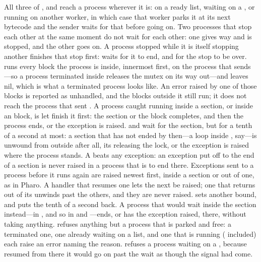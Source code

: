 All three of ,  and  reach a
process wherever it is: on a ready list, waiting on a , or
running on another worker, in which case that worker parks it at its next
bytecode and the sender waits for that before going on. Two processes that
stop each other at the same moment do not wait for each other: one gives way
and is stopped, and the other goes on. A process stopped while it is itself
stopping another finishes that stop first:  waits for it to
end, and  for the stop to be over.  runs
every  block the process is inside, innermost first, on the
process that sends ---so a process terminated inside
 releases the mutex on its way out---and leaves
 nil, which is what a terminated process looks like.
An error raised by one of those blocks is reported as unhandled, and the
blocks outside it still run; it does not reach the process that sent
.
A process caught running inside a  section, or inside an
 block, is let finish it first: the section or the block
completes, and then the process ends, or the exception is raised.
 and  wait for the section, but for a
tenth of a second at most: a section that has not ended by then---a loop
inside , say---is unwound from outside after all, its
 releasing the lock, or the exception is raised where the process
stands. A  beats any exception: an exception put off to the
end of a section is never raised in a process that is to end there.
Exceptions sent to a process before it runs again are raised newest first,
inside a section or out of one, as in Pharo. A handler that resumes one lets
the next be raised; one that returns out of its  unwinds past the
others, and they are never raised.
 sets another bound, and  puts
the tenth of a second back. A process
that would wait inside the section instead---in ,
and so in  and ---ends, or has the
exception raised, there, without taking anything.
 refuses anything but a process that is parked and free: a
terminated one, one already waiting on a list, and one that is running
( included) each raise an error naming
the reason.  refuses a process waiting on a ,
because resumed from there it would go on past the wait as though the signal
had come.


